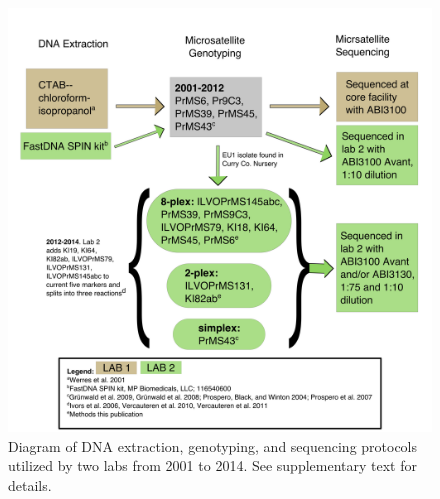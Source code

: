 \documentclass[double,12pt]{beavtex}
\begin{document}
  \begin{figure}
  
  {\centering \includegraphics[width=1\linewidth]{figure/phytopathology/figureS1} 
  
  }
  
  \caption[Diagram of DNA extraction, genotyping, and sequencing protocols 
  utilized by two labs from 2001 to 2014.]{Diagram of DNA extraction, genotyping, and sequencing protocols 
  utilized by two labs from 2001 to 2014. See supplementary text for details.}\label{fig:ramS1}
  \end{figure}
  
\end{document}
